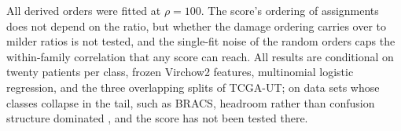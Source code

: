 All derived orders were fitted at $\rho=100$. The score's ordering of assignments does not depend on the ratio, but whether the damage ordering carries over to milder ratios is not tested, and the single-fit noise of the random orders caps the within-family correlation that any score can reach. All results are conditional on twenty patients per class, frozen Virchow2 features, multinomial logistic regression, and the three overlapping splits of TCGA-UT; on data sets whose classes collapse in the tail, such as BRACS, headroom rather than confusion structure dominated \citep{queisler2026tailBracs}, and the score has not been tested there.
